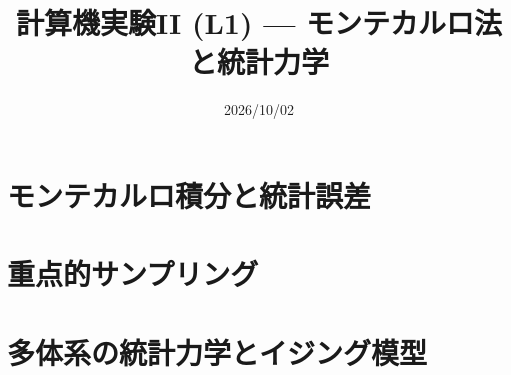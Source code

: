 \documentclass[10pt,dvipdfmx]{beamer}
\title{計算機実験II (L1) --- モンテカルロ法と統計力学}
\date{2026/10/02}
\begin{document}
\begin{frame}
  \titlepage
  \tableofcontents
\end{frame}



% 

\section{モンテカルロ積分と統計誤差}










%
%
%





\section{重点的サンプリング}












\section{多体系の統計力学とイジング模型}
\end{document}
